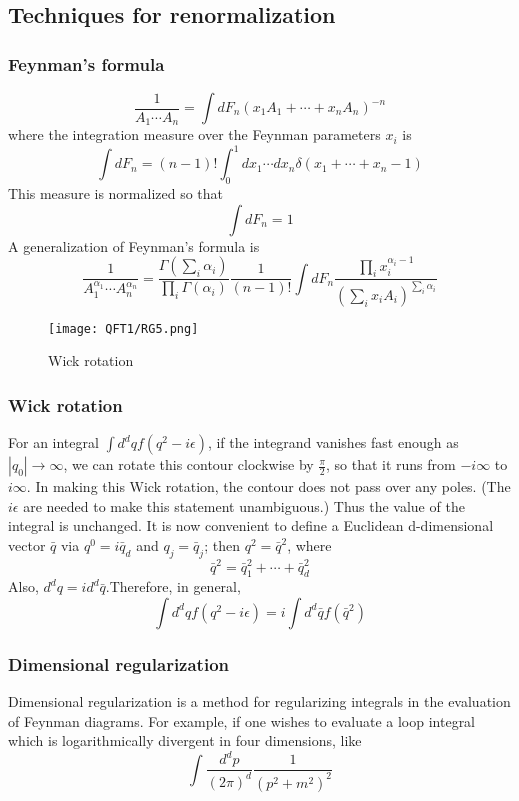 \subsection{Techniques for renormalization}
\subsubsection{Feynman's formula}
\begin{newthem}
\[ \frac{1}{A_1 \cdots A_n} = \int dF_n (x_1A_1+ \cdots +x_nA_n)^{-n}\]
where the integration measure over the Feynman parameters $x_i$ is
\[\int dF_n = (n-1)! \int_0^1 dx_1 \cdots dx_n \delta(x_1+\cdots+x_n-1)\]
This measure is normalized so that
\[\int dF_n = 1\]
A generalization of Feynman's formula is
\[ \frac{1}{A_1^{\alpha_1} \cdots A_n^{\alpha_n}} = \frac{\Gamma(\sum_i \alpha_i)}{\prod_i \Gamma(\alpha_i)} \frac{1}{(n-1)!}\int dF_n \frac{\prod_i x_i^{\alpha_i-1}}{(\sum_i x_i A_i)^{\sum_i \alpha_i}}\]
\end{newthem}
\begin{figure}[!h]
\centering
\texttt{[image: QFT1/RG5.png]}
\caption{Wick rotation}
\end{figure}

\subsubsection{Wick rotation}
For an integral $\int d^d q f(q^2-i\epsilon)$, if the integrand vanishes fast enough as $|q_0| \to \infty$, we can rotate this contour clockwise by $\frac{\pi}{2}$, so that it runs from $-i\infty$ to $i\infty$. In making this Wick rotation, the contour does not pass over any poles. (The $i\epsilon$ are needed to make this statement unambiguous.) Thus the value of the integral is unchanged. It is now convenient to define a Euclidean d-dimensional vector $\bar{q}$ via $q^0 = i \bar{q}_d$ and $q_j = \bar{q}_j$; then $q^2 = \bar{q}^2$, where
\[\bar{q}^2 = \bar{q}_1^2 + \cdots + \bar{q}_d^2\]
Also, $d^dq = id^d \bar{q}$.Therefore, in general,
\[\int d^d q f(q^2-i\epsilon) = i \int d^d\bar{q} f(\bar{q}^2)\]

\subsubsection{Dimensional regularization}
Dimensional regularization is a method for regularizing integrals in the evaluation of Feynman diagrams. For example, if one wishes to evaluate a loop integral which is logarithmically divergent in four dimensions, like
\[\int {\frac {d^{d}p}{(2\pi )^{d}}}{\frac {1}{\left(p^{2}+m^{2}\right)^{2}}}\]


